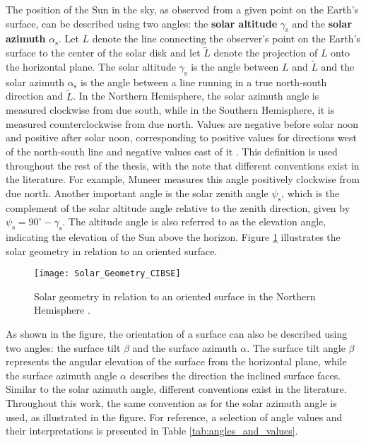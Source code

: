 
The position of the Sun in the sky, as observed from a given point on the Earth's surface, can be described
using two angles: the \textbf{solar altitude} \(\gamma_{\text{s}}\) and the \textbf{solar azimuth}
\(\alpha_{\text{s}}\). Let \(L\) denote the line connecting the observer's point on the Earth's surface to the
center of the solar disk and let \(\tilde{L}\) denote the projection of \(L\) onto the horizontal plane.
The solar altitude \(\gamma_{\text{s}}\) is the angle between \(L\) and \(\tilde{L}\) and the solar azimuth \(\alpha_{\text{s}}\)
is the angle between a line running in a true north-south direction and \(\tilde{L}\). In the Northern Hemisphere,
the solar azimuth angle is measured clockwise from due south, while in the Southern Hemisphere, it is measured
counterclockwise from due north. Values are negative before solar noon and positive after solar noon, corresponding
to positive values for directions west of the north-south line and negative values east of it \cite[p. 9]{CIBSE}.
This definition is used throughout the rest of the thesis, with the note that different conventions exist in
the literature. For example, Muneer \cite{Muneer} measures this angle positively clockwise from due north. Another important
angle is the solar zenith angle \(\psi_{\text{s}}\), which is the complement of the solar altitude angle relative to the
zenith direction, given by \(\psi_{\text{s}} = 90^\circ - \gamma_{\text{s}}\). The altitude angle is also referred to as the
elevation angle, indicating the elevation of the Sun above the horizon. Figure \ref{fig:SolarGeometry} illustrates
the solar geometry in relation to an oriented surface.

\begin{figure}
    \centering
    \texttt{[image: Solar\_Geometry\_CIBSE]}
    \caption{\small Solar geometry in relation to an oriented surface in the Northern Hemisphere \cite{CIBSE}.}
    \label{fig:SolarGeometry} %
\end{figure}

As shown in the figure, the orientation of a surface can also be described using two angles: 
the surface tilt \(\beta\) and the surface azimuth \(\alpha\). The surface tilt angle \(\beta\) represents
the angular elevation of the surface from the horizontal plane, while the surface azimuth
angle \(\alpha\) describes the direction the inclined surface faces. Similar to the solar azimuth 
angle, different conventions exist in the literature. Throughout this work, the same  
convention as for the solar azimuth angle is used, as illustrated in the figure. For reference,
a selection of angle values and their interpretations is presented in Table \ref{tab:angles_and_values}.

